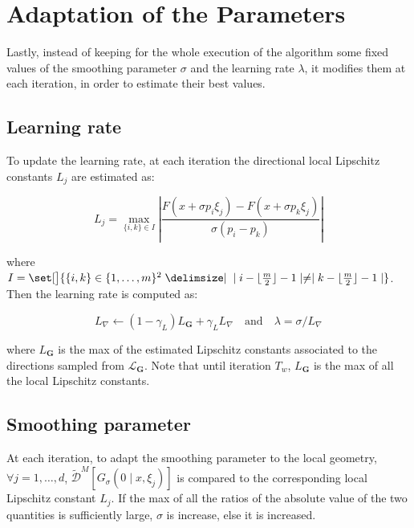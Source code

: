 
\section{Adaptation of the Parameters}\label{sect:2_3} 

Lastly, instead of keeping for the whole execution of the algorithm some fixed values of the smoothing parameter $\sigma$ and the learning rate $\lambda$, it modifies them at each iteration, in order to estimate their best values.

\subsection{Learning rate}

To update the learning rate, at each iteration the directional local Lipschitz constants $L_j$ are estimated as:

\begin{equation}\label{Lipschitz constants}
	L_{j}=\max _{\{i,k\}\in I}\left|\frac{F\left(x+\sigma p_{i} \xi_{j}\right)-F\left(x+\sigma p_{k} \xi_{j}\right)}{\sigma\left(p_{i}-p_{k}\right)}\right| 
\end{equation}

where $I=\set[\big]{ \{ i,k \} \in \{1,\dots,m \}^2 \given \mid i-\floor{\frac{m}{2}} -1\mid \neq \mid k-\floor{\frac{m}{2}} -1\mid }$. Then the learning rate is computed as:

\begin{equation}\label{learning rate}
     L_{\nabla} \leftarrow\left(1-\gamma_{L}\right) L_{\mathbf{G}}+\gamma_{L} L_{\nabla} \quad \text{and} \quad \lambda=\sigma / L_{\nabla}
\end{equation}

where $L_{\mathbf{G}}$ is the max of the estimated Lipschitz constants associated to the directions sampled from $\mathcal{L}_{\mathbf{G}}$. Note that until iteration $T_w$, $L_{\mathbf{G}}$ is the max of all the local Lipschitz constants.

\subsection{Smoothing parameter}
 
At each iteration, to adapt the smoothing parameter to the local geometry, $\forall j=1,\dots,d$, $\widetilde{\mathcal{D}}^{M}\left[G_{\sigma}\left(0 \mid x, \xi_{j}\right)\right]$ is compared to the corresponding local Lipschitz constant $L_j$. If the max of all the ratios of the absolute value of the two quantities is sufficiently large, $\sigma$ is increase, else it is increased.


